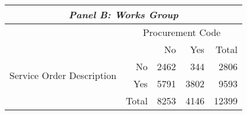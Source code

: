 \begin{table}[!hbtp]
  \caption{ }
  \centering
  \footnotesize
  \begin{tabular}{crrrr}
    \hline

    \hline
    \multicolumn{5}{c}{\emph{Panel B: Works Group}} \T \B \\
    \hline
    & \multicolumn{4}{c}{\parbox{.25\textwidth}{\centering Procurement Code}} \T \B \\
    \multirow{4}{*}{\parbox[c][][c]{.15\textwidth}{\centering Service Order Description}}                     & \multicolumn{1}{l}{} & No & Yes & Total \T \B \\
                         \cline{2-5}
                         & No        & 2462      & 344       & 2806  \T \B \\
                         & Yes       & 5791      & 3802      & 9593  \T \B \\
                         \cline{2-5}
                         & Total     & 8253      & 4146      & 12399 \T \B \\
    \hline

    \hline
  \end{tabular}
\end{table}